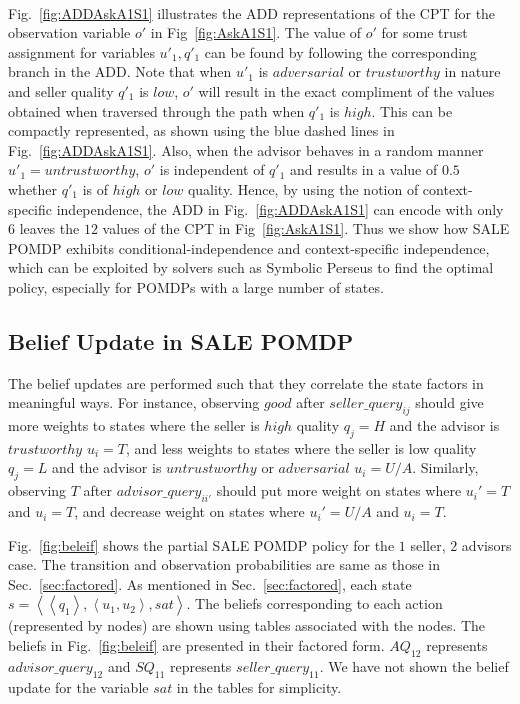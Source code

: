 \documentclass{aamas2014}
\providecommand{\SALEP}{SALE POMDP}
\begin{document}
\\ Fig.~\ref{fig:ADDAskA1S1} illustrates the ADD representations of the CPT for the observation variable $o'$ in Fig~\ref{fig:AskA1S1}. The value of $o'$ for some trust assignment for variables $u'_1, q'_1$ can be found by following the corresponding branch in the ADD.  Note that when $u'_1$ is $adversarial$ or $trustworthy$ in nature and seller quality $q'_1$ is $low$, $o'$ will result in the exact compliment of the values obtained when traversed through the path when $q'_1$ is $high$. This can be compactly represented, as shown using the blue dashed lines in Fig.~\ref{fig:ADDAskA1S1}. Also, when the advisor behaves in a random manner $u'_1 = untrustworthy$, $o'$ is independent of $q'_1$  and results in a value of $0.5$ whether $q'_1$ is of $high$ or $low$ quality. Hence, by using the notion of context-specific independence, the ADD in Fig.~\ref{fig:ADDAskA1S1} can encode with only $6$ leaves the $12$ values of the CPT in Fig~\ref{fig:AskA1S1}.  Thus we show how \SALEP{} exhibits conditional-independence and context-specific independence, which can be exploited by solvers such as Symbolic Perseus to find the optimal policy, especially for POMDPs with a large number of states.

\subsection{Belief Update in \SALEP{}}\label{sec:4}
The belief updates are performed such that they correlate the state factors in meaningful ways. For instance, observing $good$ after $seller\_query_{ij}$ should give more weights to states where the seller is $high$ quality $q_j = H$ and the advisor is $trustworthy$ $u_i = T$, and less weights to states where the seller is low quality $q_j = L$ and the advisor is $untrustworthy$ or $adversarial$ $u_i = U/A$.  Similarly, observing $T$ after $advisor\_query_{ii'}$ should put more weight on states where $u_i' = T$ and $u_i = T$, and decrease weight on states where $u_i' = U/A$ and $u_i = T$.

Fig.~\ref{fig:beleif} shows the partial \SALEP{} policy for the $1$ seller, $2$ advisors case. The transition and observation probabilities are same as those in Sec.~\ref{sec:factored}. As mentioned in Sec.~\ref{sec:factored}, each state $s=\left\langle \left\langle q_1\right\rangle, \left\langle u_1, u_2\right\rangle, sat\right\rangle$. The beliefs corresponding to each action (represented by nodes) are shown using tables associated with the nodes. The beliefs in  Fig.~\ref{fig:beleif} are presented in their factored form.  $AQ_{12}$ represents $advisor\_query_{12}$ and $SQ_{11}$ represents $seller\_query_{11}$. We have not shown the belief update for the variable $sat$ in the tables for simplicity.
\end{document}
